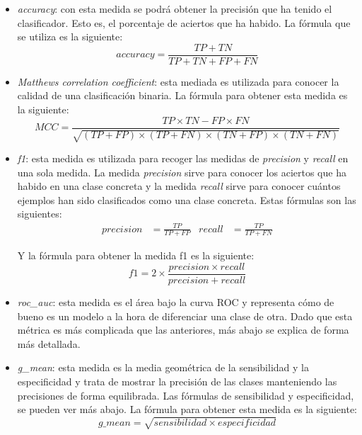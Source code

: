 \begin{itemize}
	\item \textit{accuracy}: con esta medida se podrá obtener la precisión que ha tenido el clasificador. Esto es, el porcentaje de aciertos que ha habido. La fórmula que se utiliza es la siguiente:
	\begin{equation}
		accuracy = \frac{TP + TN}{TP + TN + FP + FN}
	\end{equation}

	\item \textit{Matthews correlation coefficient}: esta mediada es utilizada para conocer la calidad de una clasificación binaria. La fórmula para obtener esta medida es la siguiente:
	\begin{equation}
		MCC = \frac{TP\times TN-FP\times FN}{\sqrt{(TP+FP)\times(TP+FN)\times(TN+FP)\times(TN+FN)}}
	\end{equation}

	\item \textit{f1}: esta medida es utilizada para recoger las medidas de \textit{precision} y \textit{recall} en una sola medida. La medida \textit{precision} sirve para conocer los aciertos que ha habido en una clase concreta y la medida \textit{recall} sirve para conocer cuántos ejemplos han sido clasificados como una clase concreta. Estas fórmulas son las siguientes:
	\begin{align}
		precision &= \frac{TP}{TP+FP} &
		recall &= \frac{TP}{TP+FN}
	\end{align}
	
	Y la fórmula para obtener la medida f1 es la siguiente:
	\begin{equation}
		f1 = 2\times \frac{precision\times recall}{precision + recall}
	\end{equation}

	\item \textit{roc\_auc}: esta medida es el área bajo la curva ROC y representa cómo de bueno es un modelo a la hora de diferenciar una clase de otra. Dado que esta métrica es más complicada que las anteriores, más abajo se explica de forma más detallada.
	\item \textit{g\_mean}: esta medida es la media geométrica de la sensibilidad y la especificidad y trata de mostrar la precisión de las clases manteniendo las precisiones de forma equilibrada. Las fórmulas de sensibilidad y especificidad, se pueden ver más abajo. La fórmula para obtener esta medida es la siguiente:
	\begin{equation}
		g\_mean = \sqrt{sensibilidad \times especificidad}
	\end{equation}
\end{itemize}

